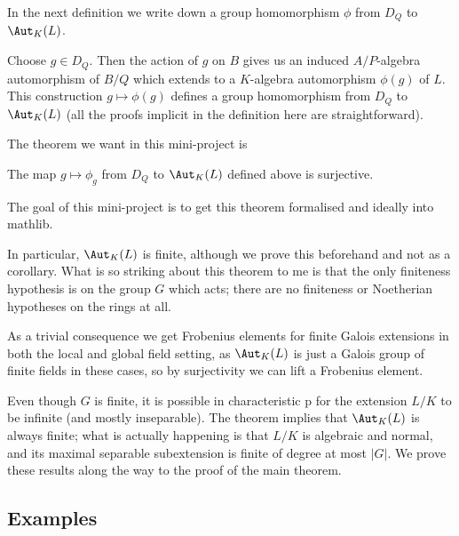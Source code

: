 In the next definition we write down a group homomorphism $\phi$ from $D_Q$ to $\Aut_K(L)$.

\begin{definition}
  \label{Bourbaki52222.stabilizer.toGaloisGroup}
  Choose $g\in D_Q$. Then the action of $g$ on $B$ gives us an induced
  $A/P$-algebra automorphism of $B/Q$ which extends to a $K$-algebra automorphism $\phi(g)$ of $L$.
  This construction $g\mapsto \phi(g)$ defines a group homomorphism from $D_Q$
  to $\Aut_K(L)$ (all the proofs implicit in the definition here are straightforward).
  \leanok
\end{definition}

The theorem we want in this mini-project is
\begin{theorem}
  \label{Bourbaki52222.MulAction.stabilizer_surjective_of_action}
  \leanok
  The map $g\mapsto \phi_g$ from $D_Q$ to $\Aut_K(L)$ defined above is surjective.
\end{theorem}

The goal of this mini-project is to get this theorem formalised and ideally into mathlib.

In particular, $\Aut_K(L)$ is finite, although we prove this beforehand and not
as a corollary. What is so striking about this theorem to me is that the only finiteness hypothesis
is on the group $G$ which acts; there are no finiteness or Noetherian
hypotheses on the rings at all.

As a trivial consequence we get Frobenius elements for finite Galois extensions in both
the local and global field setting, as $\Aut_K(L)$ is just a Galois group of finite fields
in these cases, so by surjectivity we can lift a Frobenius element.

Even though $G$ is finite, it is possible in characteristic p for the extension $L/K$ to be
infinite (and mostly inseparable). The theorem implies that $\Aut_K(L)$ is always finite;
what is actually happening is that $L/K$ is algebraic and normal, and its maximal separable
subextension is finite of degree at most $|G|$. We prove these results along the way to the
proof of the main theorem.

\subsection{Examples}

